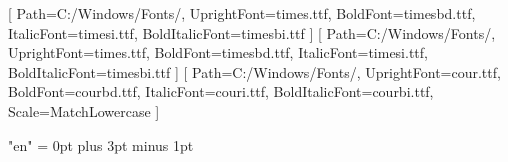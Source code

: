 \usepackage{fontspec}
\setmainfont{Times New Roman}[
  Path=C:/Windows/Fonts/,
  UprightFont=times.ttf,
  BoldFont=timesbd.ttf,
  ItalicFont=timesi.ttf,
  BoldItalicFont=timesbi.ttf
]
\setsansfont{Times New Roman}[
  Path=C:/Windows/Fonts/,
  UprightFont=times.ttf,
  BoldFont=timesbd.ttf,
  ItalicFont=timesi.ttf,
  BoldItalicFont=timesbi.ttf
]
\setmonofont{Courier New}[
  Path=C:/Windows/Fonts/,
  UprightFont=cour.ttf,
  BoldFont=courbd.ttf,
  ItalicFont=couri.ttf,
  BoldItalicFont=courbi.ttf,
  Scale=MatchLowercase
]
\usepackage[russian]{babel}
\usepackage{microtype}
\usepackage{xurl}
\usepackage{fvextra}

\XeTeXlinebreaklocale "en"
\XeTeXlinebreakskip = 0pt plus 3pt minus 1pt


\usepackage{amsmath,amsfonts,amssymb,amsthm,mathtools}
\usepackage{icomma}


\usepackage{euscript}
\usepackage{mathrsfs}

\makeatletter
\newcommand\thefontsize{The current font size is: \f@size pt}
\makeatother

\makeatletter
\setlength{\headheight}{28pt}
\renewcommand\Huge{\@setfontsize\Huge{14pt}{10}}
\renewcommand\huge{\@setfontsize\huge{14pt}{10}}
\renewcommand\Large{\@setfontsize\Large{14pt}{10}}
\renewcommand\large{\@setfontsize\large{12pt}{10}}
\makeatother

\usepackage[left=3cm,right=1.5cm,top=2cm,bottom=2cm,bindingoffset=0cm]{geometry}

\usepackage{enumitem}
\makeatletter
{}
\makeatother

\usepackage{caption}
\captionsetup{labelsep=endash}
\captionsetup[figure]{justification=centering}
\captionsetup[table]{justification=raggedright, singlelinecheck=false}
\addto\captionsrussian{\renewcommand{\figurename}{Рисунок}}
\usepackage{graphicx}
\graphicspath{{images/}{images2/}}
\setlength\fboxsep{3pt}
\setlength\fboxrule{1pt}
\usepackage{wrapfig}

